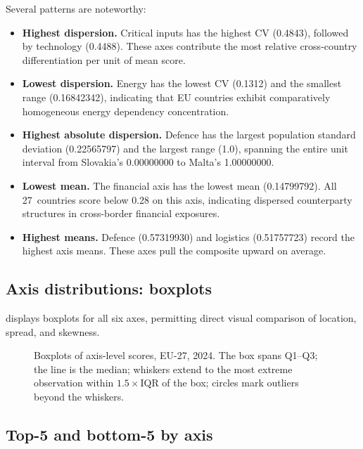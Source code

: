 Several patterns are noteworthy:

\begin{itemize}[leftmargin=2em]
  \item \textbf{Highest dispersion.}  Critical inputs has the highest
    CV (0.4843), followed by technology (0.4488).  These axes
    contribute the most relative cross-country differentiation per
    unit of mean score.

  \item \textbf{Lowest dispersion.}  Energy has the lowest CV
    (0.1312) and the smallest range (\num{0.16842342}), indicating
    that EU countries exhibit comparatively homogeneous energy
    dependency concentration.

  \item \textbf{Highest absolute dispersion.}  Defence has the
    largest population standard deviation (\num{0.22565797}) and
    the largest range (1.0), spanning the entire unit interval from
    Slovakia's \num{0.00000000} to Malta's \num{1.00000000}.

  \item \textbf{Lowest mean.}  The financial axis has the lowest mean
    (\num{0.14799792}).  All 27~countries score below 0.28 on this
    axis, indicating dispersed counterparty structures in cross-border
    financial exposures.

  \item \textbf{Highest means.}  Defence (\num{0.57319930}) and
    logistics (\num{0.51757723}) record the highest axis means.
    These axes pull the composite upward on average.
\end{itemize}

\subsection{Axis distributions: boxplots}

 displays boxplots for all six axes, permitting
direct visual comparison of location, spread, and skewness.

\begin{figure}[htbp]
\centering

\caption{Boxplots of axis-level scores, EU-27, 2024.  The box spans
  Q1--Q3; the line is the median; whiskers extend to the most extreme
  observation within $1.5 \times \text{IQR}$ of the box; circles mark
  outliers beyond the whiskers.}
\label{fig:boxplots}
\end{figure}

\subsection{Top-5 and bottom-5 by axis}

